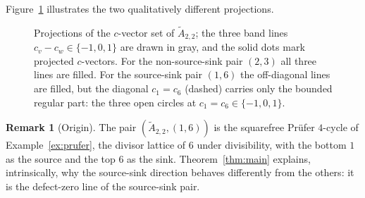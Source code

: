 \documentclass[11pt, a4paper]{amsart}
\theoremstyle{definition}
\newtheorem{remark}[theorem]{Remark}
\begin{document}
Figure~\ref{fig:proj} illustrates the two qualitatively different
projections.

\begin{figure}[ht]
\centering
{}
\caption{Projections of the $c$-vector set of $\widetilde{A}_{2,2}$; the three
band lines $c_v - c_w \in \{-1, 0, 1\}$ are drawn in gray, and the solid dots
mark projected $c$-vectors. For the non-source-sink pair $(2, 3)$ all three lines are
filled. For the source-sink pair $(1, 6)$ the off-diagonal lines are filled,
but the diagonal $c_1 = c_6$ \textup{(}dashed\textup{)} carries only the
bounded regular part: the three open circles at $c_1 = c_6 \in \{-1, 0, 1\}$.}
\label{fig:proj}
\end{figure}

\begin{remark}[Origin]
\label{rem:origin}
The pair $(\widetilde{A}_{2,2}, (1, 6))$ is the squarefree Pr\"ufer
$4$-cycle of Example~\ref{ex:prufer}, the divisor lattice of $6$ under
divisibility, with the bottom $1$ as the source and the top $6$ as the
sink. Theorem~\ref{thm:main} explains, intrinsically, why the
source-sink direction behaves differently from the others: it is the
defect-zero line of the source-sink pair.
\end{remark}
\end{document}
